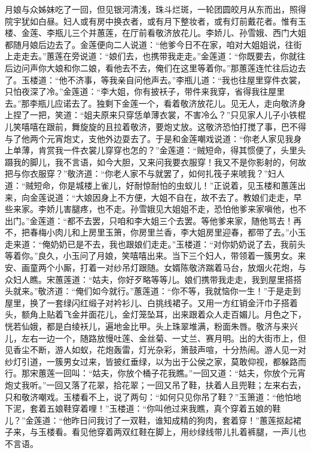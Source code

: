 月娘与众姊妹吃了一回，但见银河清浅，珠斗烂斑，一轮团圆皎月从东而出，照得院宇犹如白昼。妇人或有房中换衣者，或有月下整妆者，或有灯前戴花者。惟有玉楼、金莲、李瓶儿三个并蕙莲，在厅前看敬济放花儿。李娇儿、孙雪娥、西门大姐都随月娘后边去了。金莲便向二人说道：“他爹今日不在家，咱对大姐姐说，往街上走走去。”蕙莲在旁说道：“娘们去，也携带我走走。”金莲道：“你既要去，你就往后边问声你大娘和你二娘，看他去不去，俺们在这里等着你。”那蕙莲连忙往后边去了。玉楼道：“他不济事，等我亲自问他声去。”李瓶儿道：“我也往屋里穿件衣裳，只怕夜深了冷。”金莲道：“李大姐，你有披袄子，带件来我穿，省得我往屋里去。”那李瓶儿应诺去了。独剩下金莲一个，看着敬济放花儿。见无人，走向敬济身上捏了一把，笑道：“姐夫原来只穿恁单薄衣裳，不害冷么？”只见家人儿子小铁棍儿笑嘻嘻在跟前，舞旋旋的且拉着敬济，要炮丈放。这敬济恐怕打搅了事，巴不得与了他两个元宵炮丈，支他外边耍去了。于是和金莲嘲戏说道：“你老人家见我身上单薄，肯赏我一件衣裳儿穿穿也怎的？”金莲道：“贼短命，得其惯便了，头里头蹑我的脚儿，我不言语，如今大胆，又来问我要衣服穿！我又不是你影射的，何故把与你衣服穿？”敬济道：“你老人家不与就罢了，如何扎筏子来唬我？”妇人道：“贼短命，你是城楼上雀儿，好耐惊耐怕的虫蚁儿！”正说着，见玉楼和蕙莲出来，向金莲说道：“大娘因身上不方便，大姐不自在，故不去了。教娘们走走，早些来家。李娇儿害腿疼，也不走。孙雪娥见大姐姐不走，恐怕他爹来家嗔他，也不出门。”金莲道：“都不去罢，只咱和李大姐三个去罢。等他爹来家，随他骂去！再不，把春梅小肉儿和上房里玉箫，你房里兰香，李大姐房里迎春，都带了去。”小玉走来道：“俺奶奶已是不去，我也跟娘们走走。”玉楼道：“对你奶奶说了去，我前头等着你。”良久，小玉问了月娘，笑嘻嘻出来。当下三个妇人，带领着一簇男女。来安、画童两个小厮，打着一对纱吊灯跟随。女婿陈敬济踹着马台，放烟火花炮，与众妇人瞧。宋蕙莲道：“姑夫，你好歹略等等儿。娘们携带我走走，我到屋里搭搭头就来。”敬济道：“俺们如今就行。”蕙莲道：“你不等，我就恼你一生！”于是走到屋里，换了一套绿闪红缎子对衿衫儿、白挑线裙子。又用一方红销金汗巾子搭着头，额角上贴着飞金并面花儿，金灯笼坠耳，出来跟着众人走百媚儿。月色之下，恍若仙娥，都是白绫袄儿，遍地金比甲。头上珠翠堆满，粉面朱唇。敬济与来兴儿，左右一边一个，随路放慢吐莲、金丝菊、一丈兰、赛月明。出的大街市上，但见香尘不断，游人如蚁，花炮轰雷，灯光杂彩，箫鼓声喧，十分热闹。游人见一对纱灯引道，一簇男女过来，皆披红垂绿，以为出于公侯之家，莫敢仰视，都躲路而行。那宋蕙莲一回叫：“姑夫，你放个桶子花我瞧。”一回又道：“姑夫，你放个元宵炮丈我听。”一回又落了花翠，拾花翠；一回又吊了鞋，扶着人且兜鞋；左来右去，只和敬济嘲戏。玉楼看不上，说了两句：“如何只见你吊了鞋？”玉箫道：“他怕地下泥，套着五娘鞋穿着哩！”玉楼道：“你叫他过来我瞧，真个穿着五娘的鞋儿？”金莲道：“他昨日问我讨了一双鞋，谁知成精的狗肉，套着穿！”蕙莲抠起裙子来，与玉楼看。看见他穿着两双红鞋在脚上，用纱绿线带儿扎着裤腿，一声儿也不言语。

